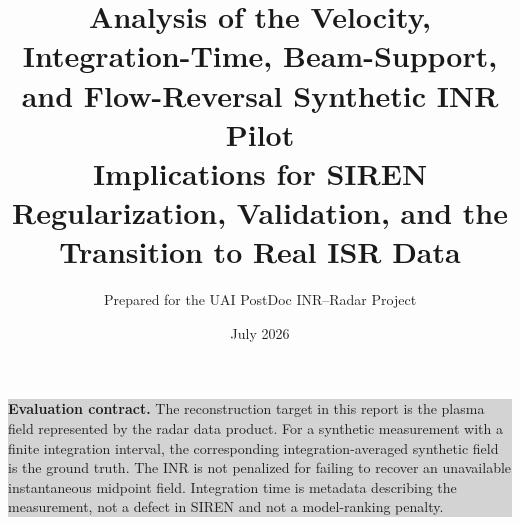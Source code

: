 \documentclass[11pt]{article}
\title{\textbf{Analysis of the Velocity, Integration-Time, Beam-Support,\\
and Flow-Reversal Synthetic INR Pilot}\\[0.6em]
\large Implications for SIREN Regularization, Validation, and the Transition to Real ISR Data}
\author{Prepared for the UAI PostDoc INR--Radar Project}
\date{July 2026}
\begin{document}
\maketitle

\begin{center}
\colorbox{lightgray}{%
\begin{minipage}{0.92\textwidth}
\textbf{Evaluation contract.}
The reconstruction target in this report is the plasma field represented by the radar data product.
For a synthetic measurement with a finite integration interval, the corresponding integration-averaged
synthetic field is the ground truth. The INR is not penalized for failing to recover an unavailable
instantaneous midpoint field. Integration time is metadata describing the measurement, not a defect in
SIREN and not a model-ranking penalty.
\end{minipage}}
\end{center}
\end{document}
